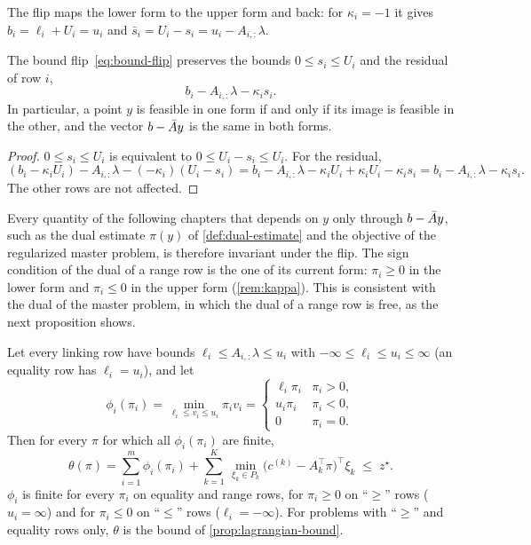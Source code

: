 The flip maps the lower form to the upper form and back: for $\kappa_i = -1$ it gives
$b_i = \ell_i + U_i = u_i$ and $\bar s_i = U_i - s_i = u_i - A_{i,:}\lambda$.

\begin{lemma} \label{lem:bound-flip}
The bound flip~\eqref{eq:bound-flip} preserves the bounds $0\le s_i\le U_i$ and the residual
of row $i$,
\[
b_i - A_{i,:}\lambda - \kappa_i s_i .
\]
In particular, a point $y$ is feasible in one form if and only if its image is feasible in
the other, and the vector $b - \bar{A} y$ is the same in both forms.
\end{lemma}

\begin{proof}
$0\le s_i\le U_i$ is equivalent to $0\le U_i - s_i\le U_i$. For the residual,
\[
(b_i - \kappa_iU_i) - A_{i,:}\lambda - (-\kappa_i)(U_i - s_i)
= b_i - A_{i,:}\lambda - \kappa_iU_i + \kappa_iU_i - \kappa_i s_i
= b_i - A_{i,:}\lambda - \kappa_i s_i .
\]
The other rows are not affected.
\end{proof}

Every quantity of the following chapters that depends on $y$ only through $b - \bar{A} y$, such
as the dual estimate $\pi(y)$ of \cref{def:dual-estimate} and the objective of the regularized
master problem, is therefore invariant under the flip. The sign condition of the dual of a
range row is the one of its current form: $\pi_i\ge0$ in the lower form and $\pi_i\le0$ in
the upper form (\cref{rem:kappa}). This is consistent with the dual of the master problem,
in which the dual of a range row is free, as the next proposition shows.

\begin{prop} \label{prop:lagrangian-general}
Let every linking row have bounds $\ell_i\le A_{i,:}\lambda\le u_i$ with
$-\infty\le\ell_i\le u_i\le\infty$ (an equality row has $\ell_i = u_i$), and let
\[
\phi_i(\pi_i) = \min_{\ell_i\le v_i\le u_i}\pi_iv_i =
\begin{cases} \ell_i\pi_i & \pi_i > 0,\\ u_i\pi_i & \pi_i < 0,\\ 0 & \pi_i = 0 .\end{cases}
\]
Then for every $\pi$ for which all $\phi_i(\pi_i)$ are finite,
\[
\theta(\pi) = \sum_{i=1}^{m}\phi_i(\pi_i) + \sum_{k=1}^{K}\,\min_{\xi_k\in P_k}\bigl(c^{(k)} - A_k^\top\pi\bigr)^\top\xi_k
\;\le\; z^\star .
\]
$\phi_i$ is finite for every $\pi_i$ on equality and range rows, for $\pi_i\ge0$ on ``$\ge$''
rows ($u_i = \infty$) and for $\pi_i\le0$ on ``$\le$'' rows ($\ell_i = -\infty$). For problems
with ``$\ge$'' and equality rows only, $\theta$ is the bound of \cref{prop:lagrangian-bound}.
\end{prop}

